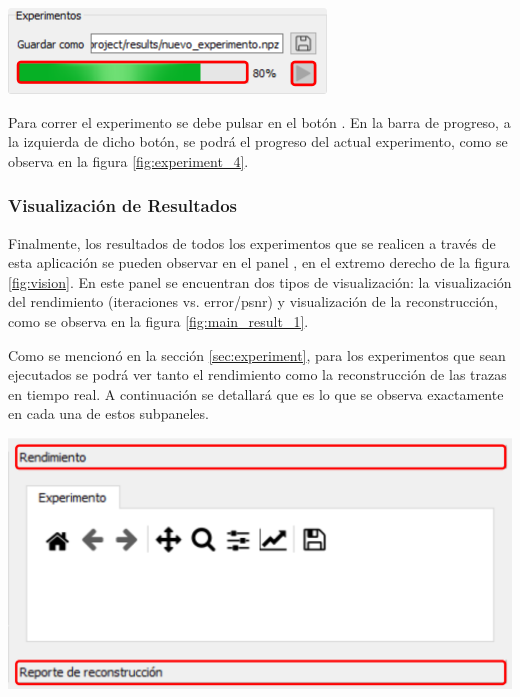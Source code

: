 \documentclass[12pt,twoside,letter]{ol-softwaremanual}
\newcommand*\circled[1]{\tikz[baseline=(char.base)]{
            \node[shape=circle,draw,inner sep=2pt] (char) {#1};}}
\newenvironment{Figure}
  {\par\medskip\noindent\minipage{\linewidth}}
  {\endminipage\par\medskip}
\begin{document}
\begin{multicols}{2}

\begin{Figure}
	\centering
	\includegraphics[width=0.7\linewidth]{experiment-4.png}
	\label{fig:experiment_4}
\end{Figure}

Para correr el experimento se debe pulsar en el botón \hspace{0.5mm} \faPlay \hspace{0.5mm}. En la barra de progreso, a la izquierda de dicho botón, se podrá el progreso del actual experimento, como se observa en la figura \ref{fig:experiment_4}.

\end{multicols}

\subsubsection{Visualización de Resultados}

Finalmente, los resultados de todos los experimentos que se realicen a través de esta aplicación se pueden observar en el panel \circled{7}, en el extremo derecho de la figura \ref{fig:vision}. En este panel se encuentran dos tipos de visualización: la visualización del rendimiento (iteraciones vs. error/psnr) y visualización de la reconstrucción, como se observa en la figura \ref{fig:main_result_1}.

\begin{multicols}{2}

Como se mencionó en la sección \ref{sec:experiment}, para los experimentos que sean ejecutados se podrá ver tanto el rendimiento como la reconstrucción de las trazas en tiempo real. A continuación se detallará que es lo que se observa exactamente en cada una de estos subpaneles.

\begin{Figure}
    \centering
    \includegraphics[width=0.7\linewidth]{main-result-1.png}
    \label{fig:main_result_1}
\end{Figure}

\end{multicols}
\end{document}
